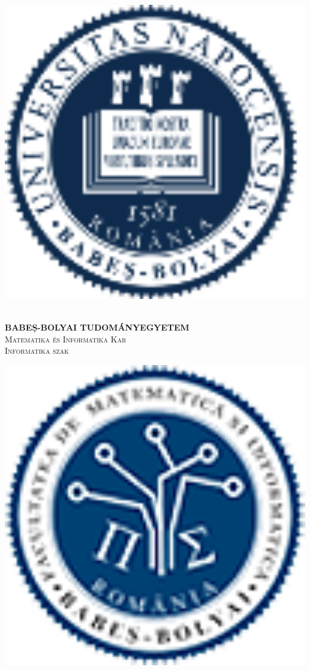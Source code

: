 \begin{titlepage}
\begin{center}

\noindent
\begin{minipage}{0.15\textwidth}
\includegraphics[width=1\textwidth]{./Images/ubb_logo_ro_100x98.png}~
\end{minipage}%
\begin{minipage}[t]{0.8\textwidth}
\begin{center}
\textbf{BABEȘ-BOLYAI TUDOMÁNYEGYETEM}\\
\textsc{Matematika és Informatika Kar}\\[0.5cm]
\textsc{Informatika szak}
\end{center}
\end{minipage}%
\begin{minipage}{0.15\textwidth}
\includegraphics[width=1\textwidth]{./Images/cs_ubb_logo.png}~

\end{minipage}
\end{center}
\end{titlepage}
